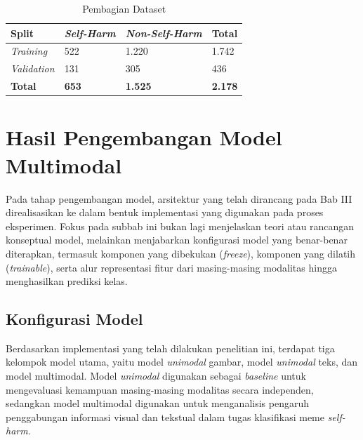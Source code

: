 \begin{table}[H]
    \centering
    \caption{Pembagian Dataset}
    \label{table:4.datasplit}
    \small
    \setlength{\tabcolsep}{3pt}
    \renewcommand{\arraystretch}{1.1}
    \begin{tabular}{p{3.5cm} p{3.0cm} p{3.5cm} p{2.5cm}}
        \hline
        \textbf{Split} & \textbf{\textit{Self-Harm}} & \textbf{\textit{Non-Self-Harm}} & \textbf{Total} \\
        \hline
        \textit{Training} & 522 & 1.220 & 1.742 \\
        \textit{Validation} & 131 & 305 & 436 \\
        \textbf{Total} & \textbf{653} & \textbf{1.525} & \textbf{2.178} \\
        \hline
    \end{tabular}
\end{table}

\section{Hasil Pengembangan Model Multimodal} \label{IV.Model}
Pada tahap pengembangan model, arsitektur yang telah dirancang pada Bab III direalisasikan ke dalam bentuk implementasi yang digunakan pada proses eksperimen. Fokus pada subbab ini bukan lagi menjelaskan teori atau rancangan konseptual model, melainkan menjabarkan konfigurasi model yang benar-benar diterapkan, termasuk komponen yang dibekukan (\textit{freeze}), komponen yang dilatih (\textit{trainable}), serta alur representasi fitur dari masing-masing modalitas hingga menghasilkan prediksi kelas.

\subsection{Konfigurasi Model} \label{IV.Model.Konfigurasi}
Berdasarkan implementasi yang telah dilakukan penelitian ini, terdapat tiga kelompok model utama, yaitu model \textit{unimodal} gambar, model \textit{unimodal} teks, dan model multimodal. Model \textit{unimodal} digunakan sebagai \textit{baseline} untuk mengevaluasi kemampuan masing-masing modalitas secara independen, sedangkan model multimodal digunakan untuk menganalisis pengaruh penggabungan informasi visual dan tekstual dalam tugas klasifikasi meme \textit{self-harm}.

